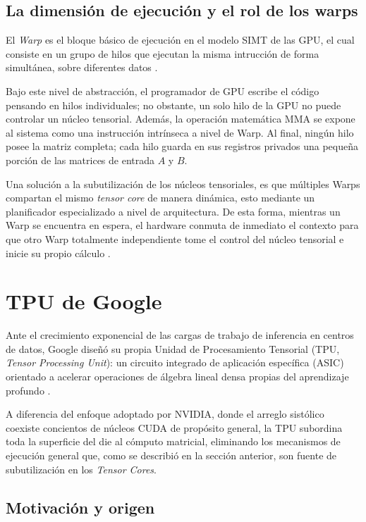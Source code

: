\documentclass[conference]{IEEEtran}
\begin{document}
\subsection{La dimensión de ejecución y el rol de los warps}
El \textit{Warp} es el bloque básico de ejecución en el modelo SIMT de las GPU, el cual consiste en 
un grupo de hilos que ejecutan la misma intrucción de forma simultánea, sobre diferentes datos \cite{nada2025cooperative}.

Bajo este nivel de abstracción, el programador de GPU escribe el código pensando en hilos individuales; no obstante, 
un solo hilo de la GPU no puede controlar un núcleo tensorial. Además, la operación matemática MMA se expone al sistema como una
instrucción intrínseca a nivel de Warp. Al final, ningún hilo posee la matriz completa; cada hilo guarda en sus registros privados
una pequeña porción de las matrices de entrada $A$ y $B$. 

Una solución a la subutilización de los núcleos tensoriales, es que múltiples Warps compartan el mismo \textit{tensor core}
de manera dinámica, esto mediante un planificador especializado a nivel de arquitectura. De esta forma,
mientras un Warp se encuentra en espera, el hardware conmuta de inmediato el contexto para que otro
Warp totalmente independiente tome el control del núcleo tensorial e inicie su propio cálculo \cite{nada2025cooperative}.


\section{TPU de Google}

Ante el crecimiento exponencial de las cargas de trabajo de inferencia en centros de datos, Google diseñó su propia Unidad de Procesamiento Tensorial (TPU, \textit{Tensor Processing Unit}): un circuito integrado de aplicación específica (ASIC) orientado a acelerar operaciones de álgebra lineal densa propias del aprendizaje profundo \cite{jouppi2023tpuv4}.

A diferencia del enfoque adoptado por NVIDIA, donde el arreglo sistólico coexiste concientos de núcleos CUDA de propósito general, la TPU subordina toda la superficie del die al cómputo matricial, eliminando los mecanismos de ejecución general que, como se describió en la sección anterior, son fuente de subutilización en los \textit{Tensor Cores}.

\subsection{Motivación y origen}
\end{document}
